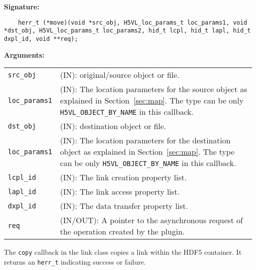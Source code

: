 \begin{mdframed}[style=bgbox]
\textbf{Signature:}
\begin{lstlisting}
    herr_t (*move)(void *src_obj, H5VL_loc_params_t loc_params1, void *dst_obj, H5VL_loc_params_t loc_params2, hid_t lcpl, hid_t lapl, hid_t dxpl_id, void **req);
\end{lstlisting}

\textbf{Arguments:}\\
\begin{tabular}{l p{13.5cm}}
  \texttt{src\_obj} & (IN): original/source object or file. \\
  \texttt{loc\_params1} & (IN): The location parameters for the source
  object as explained in Section~\ref{sec:map}. The type can be only \texttt{H5VL\_OBJECT\_BY\_NAME} in this callback. \\
  \texttt{dst\_obj} & (IN): destination object or file. \\
  \texttt{loc\_params1} & (IN): The location parameters for the destination
  object as explained in Section~\ref{sec:map}. The type can be only \texttt{H5VL\_OBJECT\_BY\_NAME} in this callback. \\
  \texttt{lcpl\_id} & (IN): The link creation property list.\\
  \texttt{lapl\_id} & (IN): The link access property list.\\
  \texttt{dxpl\_id} & (IN): The data transfer property list.\\
  \texttt{req} & (IN/OUT): A pointer to the asynchronous request of the
  operation created by the plugin.\\
\end{tabular}
\end{mdframed}

The \texttt{copy} callback in the link class copies a link within the HDF5 container. It returns an \texttt{herr\_t} indicating success or failure.\bigskip

